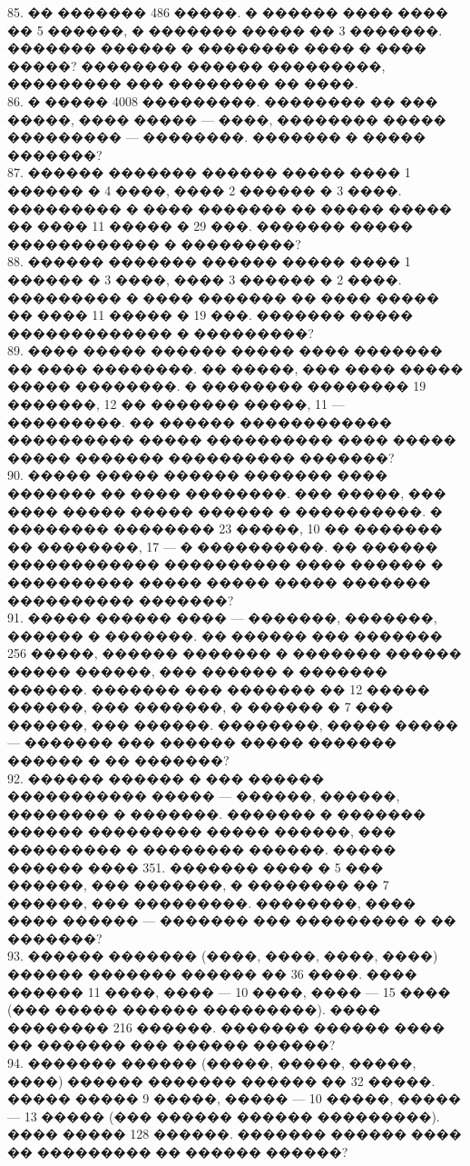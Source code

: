 \documentclass[12pt]{article}
\begin{document}
85. �� ������� 486 �����. � ������ ���� ���� �� 5 ������, � ������� ����� �� 3 �������. ������� ������ � �������� ���� � ���� �����? �������� ������ ���������, ��������� ��� �������� �� ����.\\
86. � ����� 4008 ���������. �������� �� ��� �����, ���� ����� --- ����, �������� ����� ��������� ---  ��������. ������� � ����� �������?\\
87. ������ ������� ������ ����� ���� 1 ������ � 4 ����, ���� 2 ������ � 3 ����. ��������� � ���� ������� �� ����� ����� �� ���� 11 ����� � 29 ���. ������� ����� ������������ � ���������?\\
88. ������ ������� ������ ����� ���� 1 ������ � 3 ����, ���� 3 ������ � 2 ����. ��������� � ���� ������� �� ���� ����� �� ���� 11 ����� � 19 ���. ������� ����� ������������� � ���������?\\
89. ���� ����� ������ ����� ���� ������� �� ���� ��������. �� �����, ��� ���� ����� ����� ��������. � �������� �������� 19 �������, 12 �� ������� �����, 11 --- ���������. �� ������ ������������ ���������� ����� ���������� ���� ����� ����� ������� ���������� �������?\\
90. ����� ����� ������ ������� ���� ������� �� ���� ��������. ��� �����, ��� ���� ����� ����� ������ � ����������. � �������� �������� 23 �����, 10 �� ������� �� ��������, 17 --- � ����������. �� ������ ������������ ���������� ���� ������ � ���������� ����� ����� ����� ������� ���������� �������?\\
91. ����� ������ ���� --- �������, �������, ������ � �������. �� ������ ��� ������� 256 �����, ������ ������� � ������� ������ ����� ������, ��� ������ � ������� ������. ������� ��� ������� �� 12 ����� ������, ��� �������, � ������ � 7 ��� ������, ��� ������. ��������, ����� ����� --- ������� ��� ������ ����� ������� ������ � �� �������?\\
92. ������ ������ � ��� ������ ����������� ����� --- ������, ������, �������� � �������. ������� � ������� ������ ��������� ����� ������, ��� ��������� � �������� ������. ����� ������ ���� 351. ������� ���� � 5 ��� ������, ��� �������, � �������� �� 7 ������, ��� ���������. ��������, ���� ���� ������ --- ������� ��� ��������� � �� �������?\\
93. ������ ������� (����, ����, ����, ����) ������ ������� ������ �� 36 ����. ���� ������ 11 ����, ���� --- 10 ����, ���� --- 15 ���� (��� ����� ������ ���������). ���� �������� 216 ������. ������� ������ ���� �� ������� ��� ������ ������?\\
94. ������� ������ (�����, �����, �����, ����) ������ ������� ������ �� 32 �����. ����� ����� 9 �����, ����� --- 10 �����, ����� --- 13 ����� (��� ������ ������ ���������). ���� ����� 128 ������. ������� ������ ���� �� ��������� �� ������ ������?\\
\end{document}
